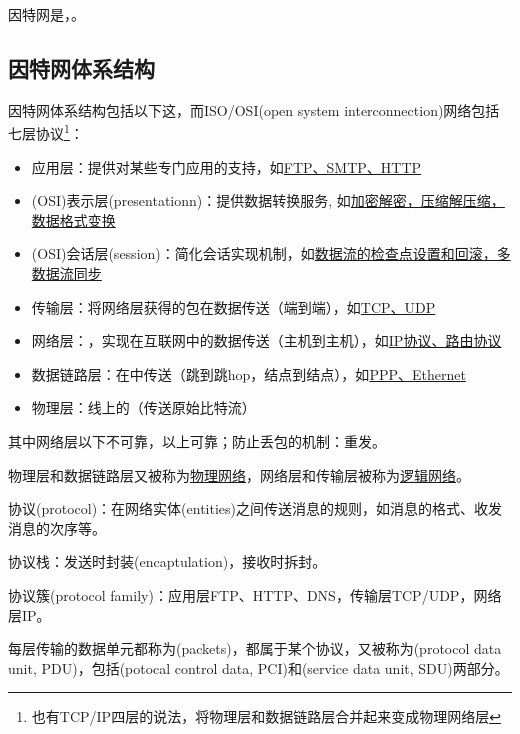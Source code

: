 因特网是，。

\subsection{因特网体系结构}
因特网体系结构包括以下这，而ISO/OSI(open system interconnection)网络包括七层协议\footnote{也有TCP/IP四层的说法，将物理层和数据链路层合并起来变成物理网络层}：
\begin{itemize}
	\item 应用层：提供对某些专门应用的支持，如\underline{FTP、SMTP、HTTP}
	\item (OSI)表示层(presentationn)：提供数据转换服务, 如\underline{加密解密，压缩解压缩，数据格式变换}
	\item (OSI)会话层(session)：简化会话实现机制，如\underline{数据流的检查点设置和回滚，多数据流同步}
	\item 传输层：将网络层获得的包在数据传送（端到端），如\underline{TCP、UDP}
	\item 网络层：，实现在互联网中的数据传送（主机到主机），如\underline{IP协议、路由协议}
	\item 数据链路层：在中传送（跳到跳hop，结点到结点），如\underline{PPP、Ethernet}
	\item 物理层：线上的（传送原始比特流）
\end{itemize}
\par 其中网络层以下不可靠，以上可靠；防止丢包的机制：重发。
\par 物理层和数据链路层又被称为\underline{物理网络}，网络层和传输层被称为\underline{逻辑网络}。

\begin{parttext}
\par 协议(protocol)：在网络实体(entities)之间传送消息的规则，如消息的格式、收发消息的次序等。
\par 协议栈：发送时封装(encaptulation)，接收时拆封。
\par 协议簇(protocol family)：应用层FTP、HTTP、DNS，传输层TCP/UDP，网络层IP。
\end{parttext}

每层传输的数据单元都称为(packets)，都属于某个协议，又被称为(protocol data unit, PDU)，包括(potocal control data, PCI)和(service data unit, SDU)两部分。

